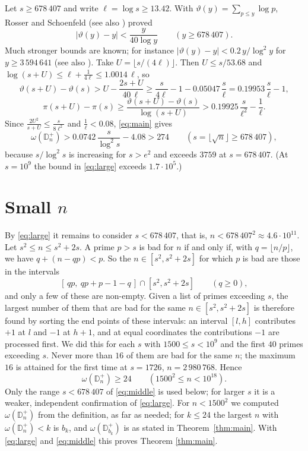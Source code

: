 \documentclass[11pt]{amsart}
\theoremstyle{remark}
\numberwithin{equation}{section}
\newcommand{\Dp}{\mathbb D^{+}}
\newcommand{\fl}[1]{\lfloor #1\rfloor}
\begin{document}
Let $s\ge678\,407$ and write $\ell=\log s\ge13.42$. With $\vartheta(y)=\sum_{p\le y}\log p$, Rosser and Schoenfeld
\cite[Corollary 2, (5.7)]{RS} (see also \cite[Table 2]{BKLNW}) proved
\begin{equation}\label{eq:RS}
|\vartheta(y)-y|<\frac y{40\log y}\qquad(y\ge678\,407).
\end{equation}
Much stronger bounds are known; for instance $|\vartheta(y)-y|<0.2\,y/\log^2y$ for $y\ge3\,594\,641$ \cite[Theorem 4.2]{D18}
(see also \cite[Table 3]{BKLNW}). Take $U=\fl{s/(4\ell)}$. Then $U\le s/53.68$ and $\log(s+U)\le\ell+\frac1{4\ell}\le1.0014\,\ell$, so
\[
\vartheta(s+U)-\vartheta(s)>U-\frac{2s+U}{40\,\ell}\ge\frac s{4\ell}-1-0.05047\,\frac s\ell=0.19953\,\frac s\ell-1,
\]
\[
\pi(s+U)-\pi(s)\ge\frac{\vartheta(s+U)-\vartheta(s)}{\log(s+U)}>0.19925\,\frac s{\ell^2}-\frac1\ell .
\]
Since $\frac{2U^2}{s+U}\le\frac s{8\ell^2}$ and $\frac1\ell<0.08$, \eqref{eq:main} gives
\begin{equation}\label{eq:large}
\omega(\Dp_n)>0.0742\,\frac s{\log^2s}-4.08>274\qquad(s=\fl{\sqrt n}\ge678\,407),
\end{equation}
because $s/\log^2s$ is increasing for $s>e^2$ and exceeds $3759$ at $s=678\,407$. (At $s=10^9$ the bound in \eqref{eq:large}
exceeds $1.7\cdot10^5$.)

\section{Small \texorpdfstring{$n$}{n}}

By \eqref{eq:large} it remains to consider $s<678\,407$, that is, $n<678\,407^2\approx4.6\cdot10^{11}$.
Let $s^2\le n\le s^2+2s$. A prime $p>s$ is bad for $n$ if and only if, with $q=\fl{n/p}$, we have
$q+(n-qp)<p$. So the $n\in[s^2,s^2+2s]$ for which $p$ is bad are those in the intervals
\[
[\,qp,\ qp+p-1-q\,]\cap[s^2,s^2+2s]\qquad(q\ge0),
\]
and only a few of these are non-empty. Given a list of primes exceeding $s$, the largest number of them that are bad for the same
$n\in[s^2,s^2+2s]$ is therefore found by sorting the end points of these intervals: an interval $[l,h]$ contributes $+1$ at $l$ and
$-1$ at $h+1$, and at equal coordinates the contributions $-1$ are processed first.
We did this for each $s$ with $1500\le s<10^9$ and the first $40$ primes exceeding $s$. Never more than $16$ of them are bad for the
same $n$; the maximum $16$ is attained for the first time at $s=1726$, $n=2\,980\,768$. Hence
\begin{equation}\label{eq:middle}
\omega(\Dp_n)\ge24\qquad(1500^2\le n<10^{18}).
\end{equation}
Only the range $s<678\,407$ of \eqref{eq:middle} is used below; for larger $s$ it is a weaker, independent confirmation of
\eqref{eq:large}. For $n<1500^2$ we computed $\omega(\Dp_n)$ from the definition, as far as needed; for $k\le24$ the largest $n$ with
$\omega(\Dp_n)<k$ is $b_k$, and $\omega(\Dp_{b_k})$ is as stated in Theorem~\ref{thm:main}. With \eqref{eq:large} and
\eqref{eq:middle} this proves Theorem \ref{thm:main}.
\end{document}
